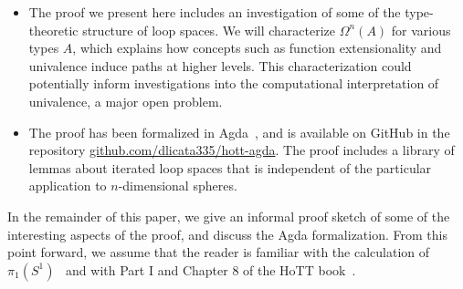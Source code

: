 \begin{itemize}
\item The proof we present here includes an investigation of some of the
  type-theoretic structure of loop spaces.  We will characterize
  $\Omega^n(A)$ for various types $A$, which explains how concepts such
  as function extensionality and univalence induce paths at higher
  levels.  This characterization could potentially inform investigations
  into the computational interpretation of univalence, a major open
  problem.  

\item The proof has been formalized in Agda~\citep{norell07thesis}, and
  is available on GitHub in the repository
  \url{github.com/dlicata335/hott-agda}.  The proof includes a library
  of lemmas about iterated loop spaces that is independent of the
  particular application to $n$-dimensional spheres.
\end{itemize}

In the remainder of this paper, we give an informal proof sketch of some
of the interesting aspects of the proof, and discuss the Agda
formalization.  From this point forward, we assume that the reader is
familiar with the calculation of $\pi_1(S^1)$~\citep{ls13pi1s1} and with
Part I and Chapter 8 of the HoTT book~\citep{uf13hott-book}.  

